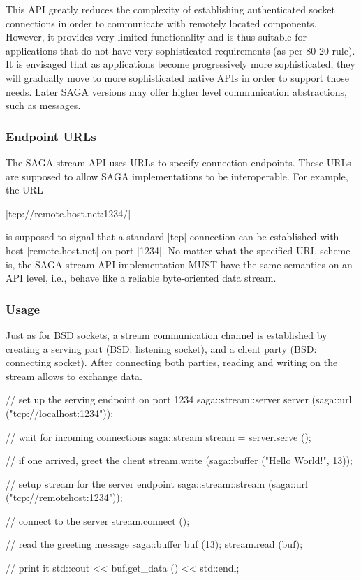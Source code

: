   This API greatly reduces the complexity of establishing
  authenticated socket connections in order to communicate with
  remotely located components.  However, it provides very
  limited functionality and is thus suitable for applications
  that do not have very sophisticated requirements (as per 80-20
  rule).  It is envisaged that as applications become
  progressively more sophisticated, they will gradually move to
  more sophisticated native APIs in order to support those
  needs.  Later SAGA versions may offer higher level
  communication abstractions, such as messages.

  \subsubsection{Endpoint URLs}

   The SAGA stream API uses URLs to specify connection
   endpoints.  These URLs are supposed to allow SAGA
   implementations to be interoperable.  For example, the URL

      \shift |tcp://remote.host.net:1234/|

   is supposed to signal that a standard |tcp| connection can be
   established with host |remote.host.net| on port |1234|.  No
   matter what the specified URL scheme is, the SAGA stream API
   implementation MUST have the same semantics on an API level, i.e.,
   behave like a reliable byte-oriented data stream.

  \subsubsection{Usage}

   Just as for BSD sockets, a stream communication channel is
   established by creating a serving part (BSD: listening
   socket), and a client party (BSD: connecting socket).  After
   connecting both parties, reading and writing on the stream
   allows to exchange data.

  \begin{mycode}[label=Stream example - server side]
  { 
    // set up the serving endpoint on port 1234
    saga::stream::server server (saga::url ("tcp://localhost:1234"));

    // wait for incoming connections
    saga::stream stream = server.serve ();

    // if one arrived, greet the client
    stream.write (saga::buffer ("Hello World!", 13));
  }
  \end{mycode}

  \begin{mycode}[label=Stream example - client side]
  { 
    // setup stream for the server endpoint
    saga::stream::stream (saga::url ("tcp://remotehost:1234"));

    // connect to the server
    stream.connect ();

    // read the greeting message
    saga::buffer buf (13);
    stream.read (buf);

    // print it
    std::cout << buf.get_data () << std::endl;
  }
  \end{mycode}


